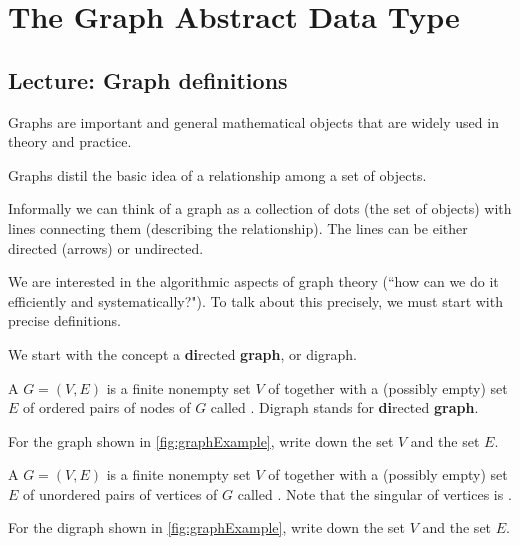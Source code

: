 \part{The Graph Abstract Data Type}
\label{ch:graphadt}


\chapter{Lecture: Graph definitions}
\label{sec:graphdefs}

Graphs are important and general mathematical objects that are widely used in theory and practice. 

Graphs distil the basic idea of a relationship among a set of objects. 

Informally we can think of a graph as a collection of dots (the set of objects) with lines connecting them (describing the relationship). 
The lines can be either directed (arrows) or undirected.

We are interested in the algorithmic aspects of graph theory (``how can we do it efficiently and systematically?").  
To talk about this precisely, we must start with precise definitions.

We start with the concept a \textbf{di}rected \textbf{graph}, or digraph. 

\begin{Definition}\label{def:digraph} 
A  $G=(V,E)$ is a  finite nonempty set $V$ of  
together with a (possibly empty) set $E$ of ordered pairs of nodes of $G$ called . 
Digraph stands for \textbf{di}rected \textbf{graph}.
\end{Definition}

\begin{Boxample}[5]
For the graph shown in \cref{fig:graphExample}, write down the set $V$ and the set $E$.
\end{Boxample}

\begin{Definition}\label{def:graph}
A  $G = (V, E)$ is a finite nonempty  set $V$ of 
 together with a (possibly empty) set $E$ of unordered
pairs of vertices of $G$ called . 
Note that the singular of vertices is .
\end{Definition}

\begin{Boxample}[5]
For the digraph shown in \cref{fig:graphExample}, write down the set $V$ and the set $E$.
\end{Boxample}


